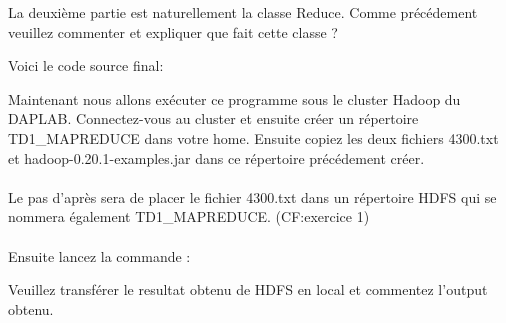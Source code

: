 \documentclass[11pt]{article}
\begin{document}




La deuxième partie est naturellement la classe Reduce. Comme précédement veuillez commenter et expliquer que fait cette classe ?





Voici le code source final:





Maintenant nous allons exécuter ce programme sous le cluster Hadoop du DAPLAB. Connectez-vous au cluster et ensuite créer un répertoire TD1\_MAPREDUCE dans votre home.
Ensuite copiez les deux fichiers 4300.txt et hadoop-0.20.1-examples.jar dans ce répertoire précédement créer. 
\paragraph{}

Le pas d'après sera de placer le fichier 4300.txt dans un répertoire HDFS qui se nommera également TD1\_MAPREDUCE. (CF:exercice 1)
\paragraph{}
Ensuite lancez la commande :





Veuillez transférer le resultat obtenu de HDFS en local et commentez l'output obtenu.
\end{document}
